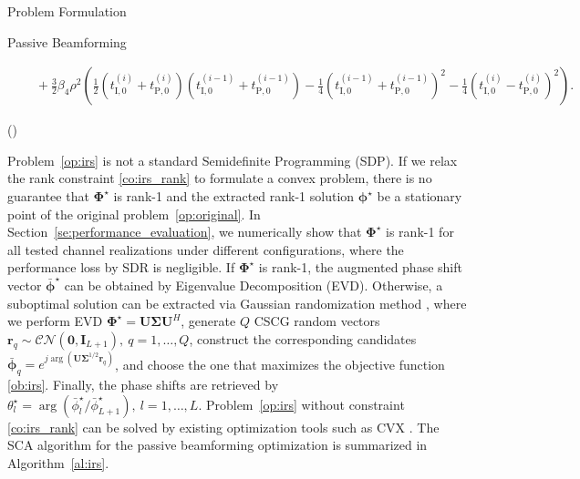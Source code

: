 \documentclass[journal]{IEEEtran}
\begin{document}
\begin{section}{Problem Formulation}
\begin{subsection}{Passive Beamforming}
\begin{figure*}[!b]
\begin{align}
					& \quad + \frac{3}{2}{\beta_4}{\rho^2} \left(\frac{1}{2}(t_{\mathrm{I},0}^{(i)} + t_{\mathrm{P},0}^{(i)})(t_{\mathrm{I},0}^{(i-1)} + t_{\mathrm{P},0}^{(i-1)}) - \frac{1}{4}(t_{\mathrm{I},0}^{(i-1)} + t_{\mathrm{P},0}^{(i-1)})^2 - \frac{1}{4}(t_{\mathrm{I},0}^{(i)} - t_{\mathrm{P},0}^{(i)})^2\right).\label{eq:z_irs_approx}
				\end{align}
			\end{figure*}
			\begin{maxi!}
				{\boldsymbol{\Phi}}{(\boldsymbol{\Phi})}{\label{op:irs}}{\label{ob:irs}}
				\label{co:irs_rate}
				\label{co:irs_modulus}
			\end{maxi!}
			Problem~\eqref{op:irs} is not a standard Semidefinite Programming (SDP). If we relax the rank constraint \eqref{co:irs_rank} to formulate a convex problem, there is no guarantee that $\boldsymbol{\Phi}^{\star}$ is rank-\num{1} and the extracted rank-\num{1} solution $\boldsymbol{\phi}^{\star}$ be a stationary point of the original problem~\eqref{op:original}. In Section~\ref{se:performance_evaluation}, we numerically show that $\boldsymbol{\Phi}^{\star}$ is rank-\num{1} for all tested channel realizations under different configurations, where the performance loss by SDR is negligible. If $\boldsymbol{\Phi}^{\star}$ is rank-\num{1}, the augmented phase shift vector $\bar{\boldsymbol{\phi}}^\star$ can be obtained by Eigenvalue Decomposition (EVD). Otherwise, a suboptimal solution can be extracted via Gaussian randomization method \cite{Huang2010}, where we perform EVD $\boldsymbol{\Phi}^{\star}=\boldsymbol{U}\boldsymbol{\Sigma}\boldsymbol{U}^H$, generate $Q$ CSCG random vectors $\boldsymbol{r}_q \sim \mathcal{CN}(\boldsymbol{0},\boldsymbol{I}_{L+1}),\ q=1,\dots,Q$, construct the corresponding candidates $\bar{\boldsymbol{\phi}}_q=e^{j\arg\left(\boldsymbol{U}\boldsymbol{\Sigma}^{1/2}\boldsymbol{r}_q\right)}$, and choose the one that maximizes the objective function \eqref{ob:irs}. Finally, the phase shifts are retrieved by $\theta_l^{\star}=\arg(\bar{\phi}_l^\star/\bar{\phi}_{L+1}^\star), \ l=1,\dots,L$. Problem~\eqref{op:irs} without constraint \eqref{co:irs_rank} can be solved by existing optimization tools such as CVX \cite{Grant2013}. The SCA algorithm for the passive beamforming optimization is summarized in Algorithm~\ref{al:irs}.
			\begin{algorithm}[!t]

\end{algorithm}
\end{subsection}
\end{section}
\end{document}
